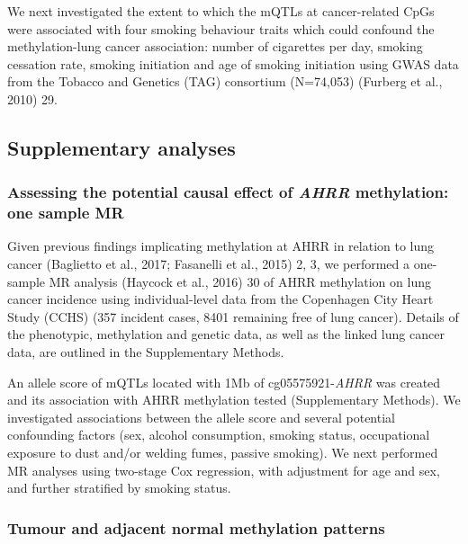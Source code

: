 \documentclass[11pt,twoside]{bristolthesis}
\begin{document}
We next investigated the extent to which the mQTLs at cancer-related CpGs were associated with four smoking behaviour traits which could confound the methylation-lung cancer association: number of cigarettes per day, smoking cessation rate, smoking initiation and age of smoking initiation using GWAS data from the Tobacco and Genetics (TAG) consortium (N=74,053) (Furberg et al., 2010) 29.

\hypertarget{supplementary-analyses}{%
\subsection{Supplementary analyses}\label{supplementary-analyses}}

\hypertarget{assessing-the-potential-causal-effect-of-ahrr-methylation-one-sample-mr}{%
\subsubsection{\texorpdfstring{Assessing the potential causal effect of \emph{AHRR} methylation: one sample MR}{Assessing the potential causal effect of AHRR methylation: one sample MR}}\label{assessing-the-potential-causal-effect-of-ahrr-methylation-one-sample-mr}}

Given previous findings implicating methylation at AHRR in relation to lung cancer (Baglietto et al., 2017; Fasanelli et al., 2015) 2, 3, we performed a one-sample MR analysis (Haycock et al., 2016) 30 of AHRR methylation on lung cancer incidence using individual-level data from the Copenhagen City Heart Study (CCHS) (357 incident cases, 8401 remaining free of lung cancer). Details of the phenotypic, methylation and genetic data, as well as the linked lung cancer data, are outlined in the Supplementary Methods.

An allele score of mQTLs located with 1Mb of cg05575921-\emph{AHRR} was created and its association with AHRR methylation tested (Supplementary Methods). We investigated associations between the allele score and several potential confounding factors (sex, alcohol consumption, smoking status, occupational exposure to dust and/or welding fumes, passive smoking). We next performed MR analyses using two-stage Cox regression, with adjustment for age and sex, and further stratified by smoking status.

\hypertarget{tumour-and-adjacent-normal-methylation-patterns}{%
\subsubsection{Tumour and adjacent normal methylation patterns}\label{tumour-and-adjacent-normal-methylation-patterns}}
\end{document}
